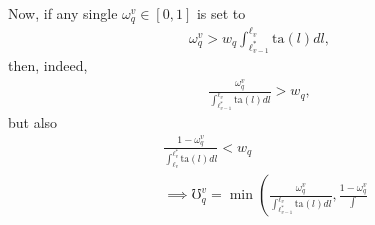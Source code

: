 \documentclass[hidelinks, nonatbib]{elsarticle}
\begin{document}
\begin{enumerate}

    Now, if any single $\omega_{q}^{v} \in [0,1]$ is set to
    \begin{gather}
        \omega_{q}^{v} > 
        w_q
        \int_{
            \ell_{v-1}^{*}
        }^{
            \ell_{v}
        }{
            \text{ta}(l)
            dl
        }
        ,
    \end{gather}
    then, indeed,
    \begin{gather}
        \frac{
            \omega_{q}^{v}
        }{
            \int_{
                \ell_{v-1}^{*}
            }^{
                \ell_{v}
            }{
                \text{ta}(l)dl
            }
        }
        >
        w_q
        ,
    \end{gather}
    but also
    \begin{align}
        &
        \frac{
            1 - \omega_{q}^{v}
        }{
            \int_{
                \ell_{v}
            }^{
                \ell_{v}^{*}
            }{
                \text{ta}(l)dl
            }
        }
        <
        w_q
        \\
        &\implies
        \mho_{q}^{v} = 
        \min\left(
            \frac{
                \omega_{q}^{v}
            }{
                \int_{
                    \ell_{v-1}^{*}
                }^{
                    \ell_{v}
                }
                \text{ta}(l)dl
            }
            ,
            \frac{
                1-\omega_{q}^{v}
            }{
                \int_{
}}
\end{align}
\end{enumerate}
\end{document}
